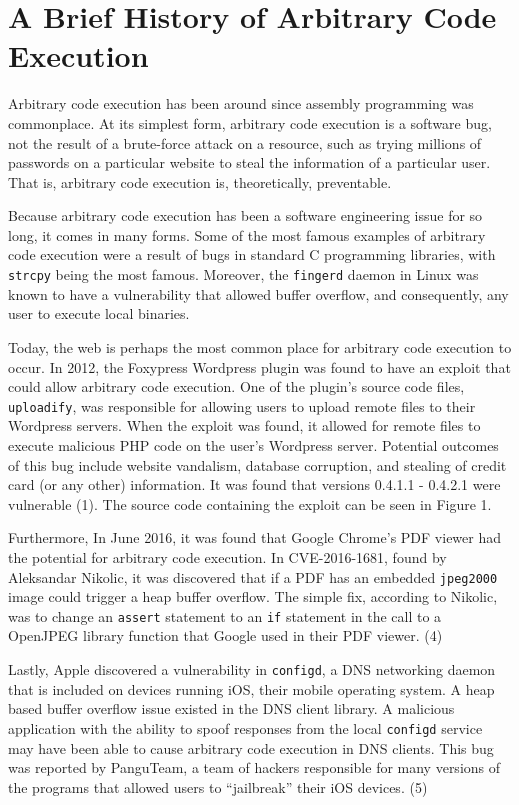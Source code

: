 \section{A Brief History of Arbitrary Code Execution}

Arbitrary code execution has been around since assembly programming was commonplace. At its simplest form, arbitrary code execution is a software bug, not the result of a brute-force attack on a resource, such as trying millions of passwords on a particular website to steal the information of a particular user. That is, arbitrary code execution is, theoretically, preventable.

Because arbitrary code execution has been a software engineering issue for so long, it comes in many forms. Some of the most famous examples of arbitrary code execution were a result of bugs in standard C programming libraries, with \texttt{strcpy} being the most famous. Moreover, the \texttt{fingerd} daemon in Linux was known to have a vulnerability that allowed buffer overflow, and consequently, any user to execute local binaries.

Today, the web is perhaps the most common place for arbitrary code execution to occur. In 2012, the Foxypress Wordpress plugin was found to have an exploit that could allow arbitrary code execution. One of the plugin’s source code files, \texttt{uploadify}, was responsible for allowing users to upload remote files to their Wordpress servers. When the exploit was found, it allowed for remote files to execute malicious PHP code on the user’s Wordpress server. Potential outcomes of this bug include website vandalism, database corruption, and stealing of credit card (or any other) information. It was found that versions 0.4.1.1 - 0.4.2.1 were vulnerable (1). The source code containing the exploit can be seen in Figure 1.

Furthermore, In June 2016, it was found that Google Chrome’s PDF viewer had the potential for arbitrary code execution. In CVE-2016-1681, found by Aleksandar Nikolic, it was discovered that if a PDF has an embedded \texttt{jpeg2000} image could trigger a heap buffer overflow. The simple fix, according to Nikolic, was to change an \texttt{assert} statement to an \texttt{if} statement in the call to a  OpenJPEG library function that Google used in their PDF viewer. (4)

Lastly, Apple discovered a vulnerability in \texttt{configd}, a DNS networking daemon that is included on devices running iOS, their mobile operating system. A heap based buffer overflow issue existed in the DNS client library. A malicious application with the ability to spoof responses from the local \texttt{configd} service may have been able to cause arbitrary code execution in DNS clients. This bug was reported by PanguTeam, a team of hackers responsible for many versions of the programs that allowed users to “jailbreak” their iOS devices. (5)